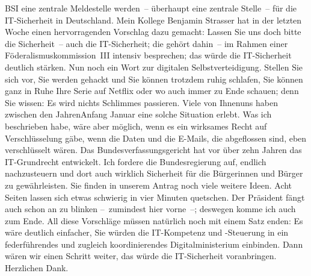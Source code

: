 \documentclass{article}
\begin{document}
BSI eine zentrale Meldestelle werden – überhaupt eine zentrale Stelle – für die IT-Sicherheit in Deutschland. Mein Kollege Benjamin Strasser hat in der letzten Woche einen hervorragenden Vorschlag dazu gemacht: Lassen Sie uns doch bitte die Sicherheit – auch die IT-Sicherheit; die gehört dahin – im Rahmen einer Föderalismuskommission III intensiv besprechen; das würde die IT-Sicherheit deutlich stärken.  Nun noch ein Wort zur digitalen Selbstverteidigung. Stellen Sie sich vor, Sie werden gehackt und Sie können trotzdem ruhig schlafen, Sie können ganz in Ruhe Ihre Serie auf Netflix oder wo auch immer zu Ende schauen; denn Sie wissen: Es wird nichts Schlimmes passieren.  Viele von Ihnen\/uns haben zwischen den Jahren\/Anfang Januar eine solche Situation erlebt. Was ich beschrieben habe, wäre aber möglich, wenn es ein wirksames Recht auf Verschlüsselung gäbe, wenn die Daten und die E-Mails, die abgeflossen sind, eben verschlüsselt wären. Das Bundesverfassungsgericht hat vor über zehn Jahren das IT-Grundrecht entwickelt. Ich fordere die Bundesregierung auf, endlich nachzusteuern und dort auch wirklich Sicherheit für die Bürgerinnen und Bürger zu gewährleisten.  Sie finden in unserem Antrag noch viele weitere Ideen. Acht Seiten lassen sich etwas schwierig in vier Minuten quetschen. Der Präsident fängt auch schon an zu blinken  – zumindest hier vorne –; deswegen komme ich auch zum Ende. All diese Vorschläge müssen natürlich noch mit einem Satz enden: Es wäre deutlich einfacher, Sie würden die IT-Kompetenz und -Steuerung in ein federführendes und zugleich koordinierendes Digitalministerium einbinden.  Dann wären wir einen Schritt weiter, das würde die IT-Sicherheit voranbringen. Herzlichen Dank.    
\end{document}
